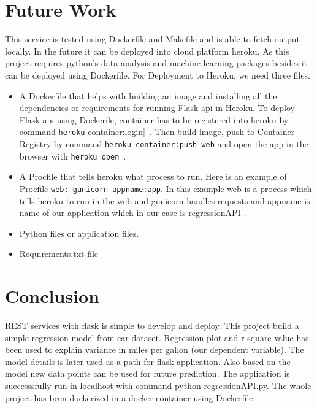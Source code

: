 \section{Future Work} 

This service is tested using Dockerfile and Makefile and is able to
fetch output locally. In the future it can be deployed into cloud
platform heroku.  As this project requires python's data analysis and
machine-learning packages besides it can be deployed using
Dockerfile. For Deployment to Heroku, we need three files.

\begin{itemize}

\item A Dockerfile that helps with building an image and installing
  all the dependencies or requirements for running Flask api in
  Heroku. To deploy Flask api using Dockerile, container has to be
  registered into heroku by command \verb|heroku|
  container:login|~\cite{hid-sp18-415-heroku-com}. Then build image,
  push to Container Registry by command
  \verb|heroku container:push web| and open the app in the browser
  with \verb|heroku open|~\cite{hid-sp18-415-heroku-com}.
 
\item A Procfile that tells heroku what process to run. Here is an
  example of Procfile \verb|web: gunicorn appname:app|. In this
  example web is a process which tells heroku to run in the web and
  gunicorn handles requests and appname is name of our application
  which in our case is
  regressionAPI~\cite{hid-sp18-415-regressionapi}.
\item Python files or application files.
\item Requirements.txt file
 
 \end{itemize}

\section{Conclusion}

REST services with flask is simple to develop and deploy.  This
project build a simple regression model from car dataset. Regression
plot and r square value has been used to explain variance in miles per
gallon (our dependent variable). The model details is later used as a
path for flask application. Also based on the model new data points
can be used for future prediction. The application is successsfully
run in localhost with command python regressionAPI.py. The whole
project has been dockerized in a docker container using Dockerfile.




